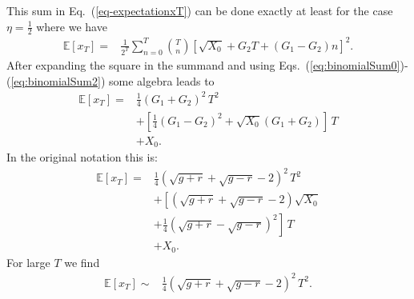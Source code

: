 \documentclass[11pt]{article}
\begin{document}
\begin{multicols}{2}
This sum in Eq.~(\ref{eq-expectationxT}) can be done exactly at least for the case $\eta = \frac{1}{2}$ where we have
\begin{align*}
 \mathbb{E}\left[x_T \right] =& \frac{1}{2^T} \sum_{n=0}^T  {T \choose n} \left[\sqrt{X_0}  +G_2 T + (G_1-G_2) n \right]^2.
\end{align*}
After expanding the square in the summand and using Eqs.~(\ref{eq:binomialSum0})-(\ref{eq:binomialSum2}) some algebra leads to
\begin{align*}
 \mathbb{E}\left[x_T \right] =& \frac{1}{4} (G_1+G_2)^2\, T^2 \\
 & + \left[\frac{1}{4}(G_1-G_2)^2 + \sqrt{X_0} (G_1+G_2)\right]\,T\\
 & +X_0.
\end{align*}
In the original notation this is:
\begin{align}
\label{eq:expectationExact} \mathbb{E}\left[x_T\right] =& \frac{1}{4}\left(\sqrt{g+r}+\sqrt{g-r}-2\right)^2\,T^2 \\
\nonumber &+ \left[ (\sqrt{g+r}+\sqrt{g-r}-2) \sqrt{X_0} \right.\\
\nonumber & \left.+ \frac{1}{4}(\sqrt{g+r}-\sqrt{g-r})^2\right]\,T\\
\nonumber &+ X_0.
\end{align}
For large  $T$ we find
\begin{align}
\label{eq:ExLargeT}
\mathbb{E}\left[x_T \right]  \sim & \frac{1}{4} \left( \sqrt{g+r} + \sqrt{g-r} -2\right)^2\, T^2.
\end{align}



\end{multicols}
\end{document}
